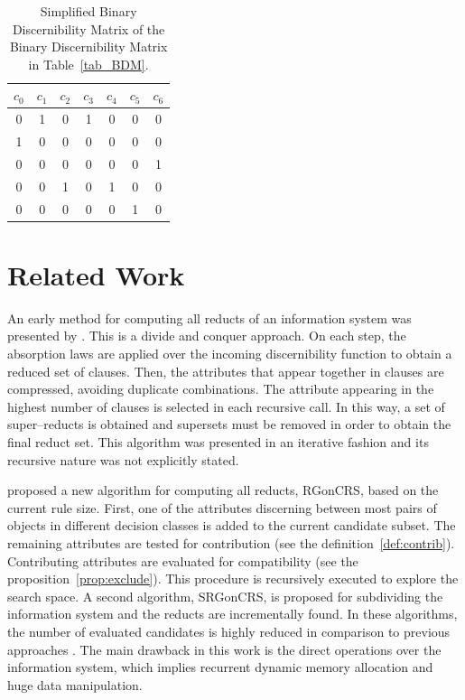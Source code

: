 \documentclass[authoryear,preprint,review,12pt]{elsarticle}
\begin{document}
     \begin{table}[htb]
		\caption{Simplified Binary Discernibility Matrix of the Binary Discernibility Matrix in Table~\ref{tab_BDM}.}
		\centering
 	\begin{tabular}{ccccccc}\label{tab:SBDM1}
            $c_0$ & $c_1$ & $c_2$ & $c_3$ & $c_4$ & $c_5$ & $c_6$\\
        		\hline
        		0&1&0&1&0&0&0\\
        		1&0&0&0&0&0&0\\
        		0&0&0&0&0&0&1\\
        		0&0&1&0&1&0&0\\
        		0&0&0&0&0&1&0\\
 	\end{tabular}             
 \end{table}  
 
 
\section{Related Work}\label{relatedWork}
  An early method for computing all reducts of an information system was presented by \cite{Starzyk99,Starzyk00}.  This is a divide and conquer approach. On each step, the absorption laws are applied over the incoming discernibility function to obtain a reduced set of clauses. Then, the attributes that appear together in  clauses are compressed, avoiding duplicate combinations. The attribute appearing in the highest number of clauses is selected in each recursive call. In this way, a set of super--reducts is obtained and supersets must be removed in order to obtain the final reduct set. This algorithm was presented in an iterative fashion and its   recursive nature was not explicitly stated. 
   
  \cite{WangP07} proposed a new algorithm for computing all reducts, RGonCRS, based on the current rule size.   First, one of the attributes discerning between most pairs of objects in different decision classes is added   to the current candidate subset. The remaining attributes are tested for contribution (see the definition~\ref{def:contrib}). Contributing attributes are evaluated for compatibility (see the proposition~\ref{prop:exclude}). This procedure is recursively executed to explore the search space. A second algorithm, SRGonCRS, is proposed for subdividing the information system and the reducts are incrementally found. In these algorithms, the number of evaluated candidates is highly reduced in comparison to previous approaches \citep{Bazan2001,Ohrn00}. The main drawback in this work is the direct operations over the information system, which implies recurrent dynamic memory allocation and huge data manipulation.
  
\end{document}
